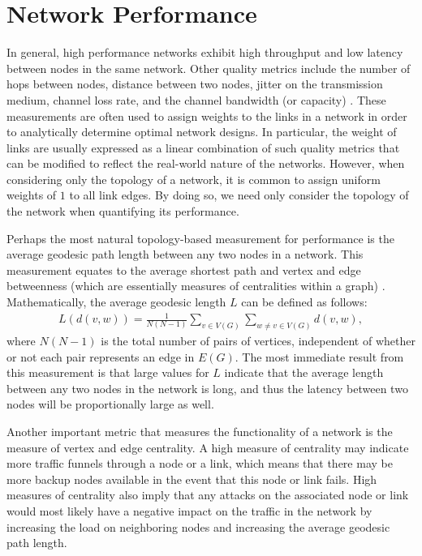 \documentclass[doc]{apa}%
\begin{document}
\section{Network Performance}
\label{NetworkFunctionality}

In general, high performance networks exhibit high throughput and low latency between nodes in the same network. Other quality metrics include the number of hops between nodes, distance between two nodes, jitter on the transmission medium, channel loss rate, and the channel bandwidth (or capacity) \cite{LargeNetworkRobustnessPVM}. These measurements are often used to assign weights to the links in a network in order to analytically determine optimal network designs. In particular, the weight of links are usually expressed as a linear combination of such quality metrics that can be modified to reflect the real-world nature of the networks. However, when considering only the topology of a network, it is common to assign uniform weights of $1$ to all link edges. By doing so, we need only consider the topology of the network when quantifying its performance. 

Perhaps the most natural topology-based measurement for performance is the average geodesic path length between any two nodes in a network. This measurement equates to the average shortest path and vertex and edge betweenness (which are essentially measures of centralities within a graph) \cite{Attacks}. Mathematically, the average geodesic length $L$ can be defined as follows:
\begin{eqnarray}
L(d(v,w)) = \frac{1}{N(N-1)}\sum_{v \in V(G)}\sum_{w \not= v \in V(G)} d(v,w),
\end{eqnarray}
where $N(N-1)$ is the total number of pairs of vertices, independent of whether or not each pair represents an edge in $E(G)$. The most immediate result from this measurement is that large values for $L$ indicate that the average length between any two nodes in the network is long, and thus the latency between two nodes will be proportionally large as well. 

Another important metric that measures the functionality of a network is the measure of vertex and edge centrality. A high measure of centrality may indicate more traffic funnels through a node or a link, which means that there may be more backup nodes available in the event that this node or link fails. High measures of centrality also imply that any attacks on the associated node or link would most likely have a negative impact on the traffic in the network by increasing the load on neighboring nodes and increasing the average geodesic path length. 
\end{document}
